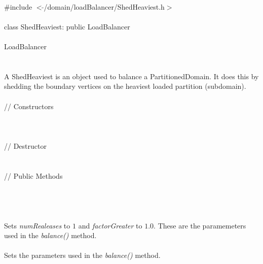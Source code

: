 
   \\
\indent \#include $<\tilde{ }$/domain/loadBalancer/ShedHeaviest.h$>$  \\

  \\
\indent class ShedHeaviest: public LoadBalancer \\

 \\
\indent  LoadBalancer \\
\indent{} \\


  \\
\indent A ShedHeaviest is an object used to balance a
PartitionedDomain. It does this by shedding the boundary vertices on
the heaviest loaded partition (subdomain). \\

  \\
\indent\indent  // Constructors  \\
\indent{}\\ 
\indent{} \\ \\
\indent\indent // Destructor  \\
\indent{}  \\ \\
\indent\indent // Public Methods  \\
\indent{} \\ \\


\\
\\ 
Sets {\em numRealeases} to $1$ and  {\em factorGreater} to
$1.0$. These are the paramemeters used in the {\em balance()}
method. \\ 

 \\
Sets the parameters used in the {\em balance()} method. \\

